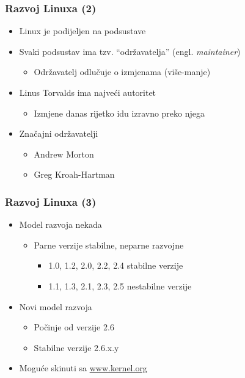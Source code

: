 \documentclass{beamer}
\begin{document}
\begin{frame}[t]
\frametitle{Razvoj Linuxa (2)}
\begin{itemize}
  \item Linux je podijeljen na podsustave
  \item Svaki podsustav ima tzv. ``održavatelja'' (engl. 
        \emph{maintainer})
  \begin{itemize}
    \item Održavatelj odlučuje o izmjenama (više-manje)
  \end{itemize}
  \item Linus Torvalds ima najveći autoritet
  \begin{itemize}
    \item Izmjene danas rijetko idu izravno preko njega
  \end{itemize}
  \item Značajni održavatelji
  \begin{itemize}
    \item Andrew Morton
    \item Greg Kroah-Hartman
  \end{itemize}
\end{itemize}
\end{frame}

\begin{frame}[t]
\frametitle{Razvoj Linuxa (3)}
\begin{itemize}
  \item Model razvoja nekada
  \begin{itemize}
    \item Parne verzije stabilne, neparne razvojne
    \begin{itemize}
      \item 1.0, 1.2, 2.0, 2.2, 2.4 stabilne verzije
      \item 1.1, 1.3, 2.1, 2.3, 2.5 nestabilne verzije
    \end{itemize}
  \end{itemize}
  \item Novi model razvoja
  \begin{itemize}
    \item Počinje od verzije 2.6
    \item Stabilne verzije 2.6.x.y
  \end{itemize}
  \item Moguće skinuti sa \url{www.kernel.org}
\end{itemize}
\end{frame}
\end{document}
